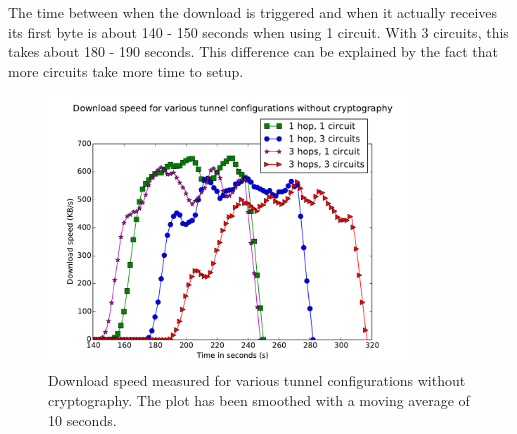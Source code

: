 The time between when the download is triggered and when it actually receives its first byte is about 140 - 150 seconds when using 1 circuit. With 3 circuits, this takes about 180 - 190 seconds. This difference can be explained by the fact that more circuits take more time to setup.

\begin{figure}[t]
	\centering
	\includegraphics[width=0.85\textwidth]{graphics/downloadspeed.pdf}
	\caption{Download speed measured for various tunnel configurations without cryptography. The plot has been smoothed with a moving average of 10 seconds.}
	\label{fig:download_measurements}
\end{figure}
